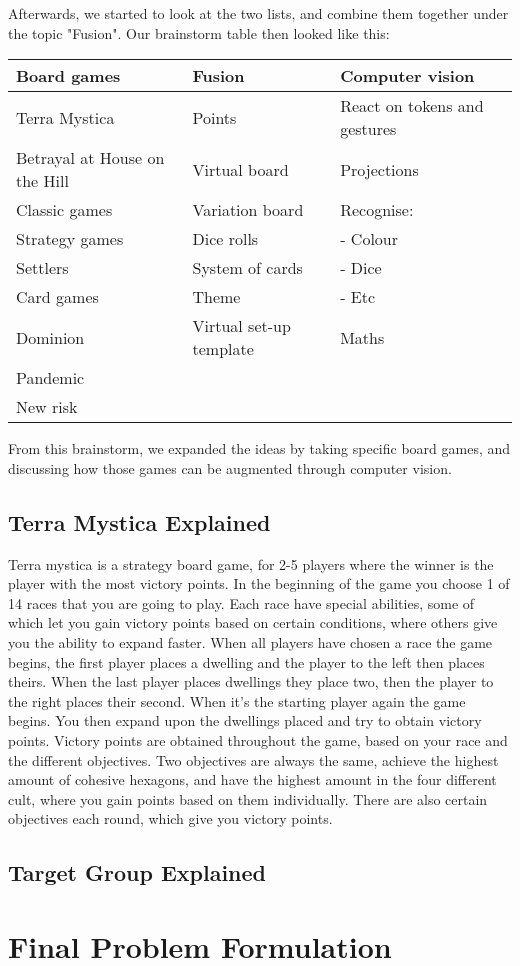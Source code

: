 Afterwards, we started to look at the two lists, and combine them together under the topic "Fusion". Our brainstorm table then looked like this:

\begin{tabular}{l | l | l}
Board games & Fusion & Computer vision\\
\hline
Terra Mystica & Points & React on tokens and gestures\\
Betrayal at House on the Hill &  Virtual board & Projections\\
Classic games & Variation board & Recognise: \\
Strategy games & Dice rolls & - Colour\\
Settlers & System of cards & - Dice\\
Card games & Theme & - Etc\\
Dominion & Virtual set-up template & Maths\\
Pandemic \\
New risk\\
\end{tabular}

From this brainstorm, we expanded the ideas by taking specific board games, and discussing how those games can be augmented through computer vision.
\subsection{Terra Mystica Explained}
Terra mystica is a strategy board game, for 2-5 players where the winner is the player with the most victory points. In the beginning of the game you choose 1 of 14 races that you are going to play. Each race have special abilities, some of which let you gain victory points based on certain conditions, where others give you the ability to expand faster. When all players have chosen a race the game begins, the first player places a dwelling and the player to the left then places theirs. When the last player places dwellings they place two, then the player to the right places their second. When it's the starting player again the game begins. You then expand upon the dwellings placed and try to obtain victory points. Victory points are obtained throughout the game, based on your race and the different objectives. Two objectives are always the same, achieve the highest amount of cohesive hexagons, and have the highest amount in the four different cult, where you gain points based on them individually. There are also certain objectives each round, which give you victory points. 

 
\subsection{Target Group Explained}

\section{Final Problem Formulation}\label{sec:finalprob}
